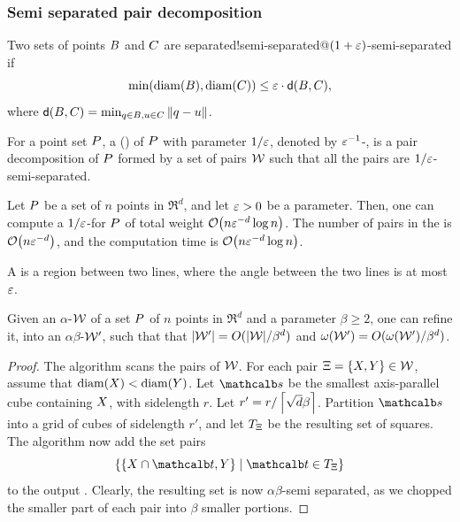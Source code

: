 \documentclass[12pt]{article}%
\begin{document}
\subsubsection{Semi separated pair decomposition}

\begin{defn}%
    Two sets of points $B$ and $C$ are
    {separated!semi-separated@$(1+\varepsilon)$-semi-separated} if
    \begin{equation*}
        \min \pth{ \diameterX{\PSB}, \diameterX{\PSC} } \leq \eps \cdot
        \dsY{\PSB}{\PSC},%
    \end{equation*}
    where
    $\dsY{ \PSB}{\PSC} = \min_{\pb \in \PSB, \pc \in \PSC}
    \dY{\pb}{\pc}$.

    For a point set $P$, a  (\emphOnly{\SSPD{}}) of $P$ with parameter
    $1/\varepsilon$, denoted by $\varepsilon^{-1}$-\SSPD, is a pair decomposition of
    $P$ formed by a set of pairs $\mathcal{W}$ such that all the pairs are
    $1/\varepsilon$-semi-separated.
\end{defn}

\begin{theorem}
    Let $P$ be a set of $n$ points in $\Re^d$, and let $\varepsilon > 0$ be
    a parameter. Then, one can compute a $1/\varepsilon$-\SSPD for $P$ of
    total weight $\Of\pth{n \eps^{-d} \log n}$. The number of pairs in
    the \SSPD is $\Of\pth{n \eps^{-d}}$, and the computation time is
    $\Of\pth{ n \eps^{-d} \log n }$.
\end{theorem}

A  is a region between two lines, where
the angle between the two lines is at most $\varepsilon$.


\begin{lemma}
    Given an $\alpha$-\SSPD $\mathcal{W}$ of a set $P$ of $n$ points in
    $\Re^d$ and a parameter $\beta \geq 2$, one can refine it, into an
    $\alpha\beta$-\SSPD $\mathcal{W}'$, such that that
    $|\mathcal{W}'| = O(|\mathcal{W}|/\beta^d)$ and
    $\WeightX{\WS'} = O(\WeightX{\WS'}/\beta^d)$.
\end{lemma}
\begin{proof}
    The algorithm scans the pairs of $\mathcal{W}$. For each pair
    $\Xi = \{ X, Y \} \in \mathcal{W}$, assume that
    $\diameterX{\PSX} < \diameterX{\PSY}$. Let $\sqr$ be the smallest
    axis-parallel cube containing $X$, with sidelength $r$.  Let
    $r' = r / \left\lceil {\sqrt{d} \beta } \right\rceil$.  Partition $\sqr$ into a grid
    of cubes of sidelength $r'$, and let $T_\Xi$ be the resulting
    set of squares. The algorithm now add the set pairs
    \begin{equation*}
        \Set{ \{ \PSX \cap \sqrA, \PSY \} }{ \sqrA \in T_\Pair }
    \end{equation*}
    to the output \SSPD. Clearly, the resulting set is now
    $\alpha\beta$-semi separated, as we chopped the smaller part of
    each pair into $\beta$ smaller portions.
\end{proof}
\end{document}
